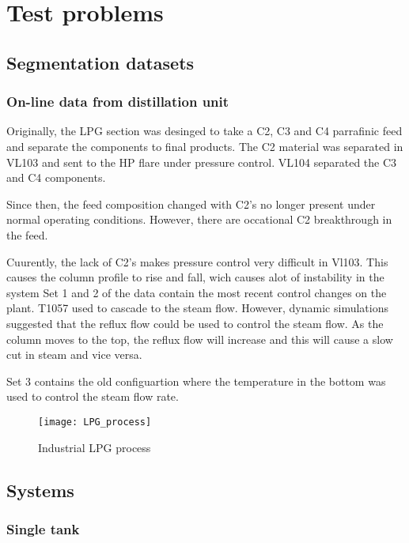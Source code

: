 \chapter{Test problems}

\section{Segmentation datasets}
\subsection{On-line data from distillation unit}
Originally, the LPG section was desinged to take a C2, C3 and C4 parrafinic feed and separate the components to final products. 
The C2 material was separated in VL103 and sent to the HP flare under pressure control. 
VL104 separated the C3 and C4 components.
 
Since then, the feed composition changed with C2's no longer present under normal operating conditions. 
However, there are occational C2 breakthrough in the feed.
 
Cuurently, the lack of C2's makes pressure control very difficult in Vl103. 
This causes the column profile to rise and fall, wich causes alot of instability in the system Set 1 and 2 of the data contain the most recent control changes on the plant. 
T1057 used to cascade to the steam flow. 
However, dynamic simulations suggested that the reflux flow could be used to control the steam flow. 
As the column moves to the top, the reflux flow will increase and this will cause a slow cut in steam and vice versa.
 
Set 3 contains the old configuartion where the temperature in the bottom was used to control the steam flow rate.

\begin{figure}[htp]
\begin{center}
  \texttt{[image: LPG\_process]}
  \caption[LPG process]{Industrial LPG process}
  \label{fig:lpgprocess}
\end{center}
\end{figure}

\section{Systems}
\subsection{Single tank}

